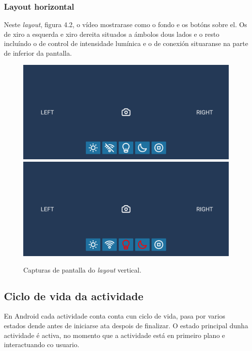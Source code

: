 \subsubsection{Layout horizontal}
Neste \emph{layout}, figura 4.2, o vídeo mostrarase como o fondo e os botóns sobre el. Os de xiro a esquerda e xiro dereita situados a ámbolos dous lados e o resto incluíndo o de control de intensidade lumínica e o de conexión situaranse na parte de inferior da pantalla.
\begin{figure}[tb]
  \centering
  \includegraphics[scale=.1]{imaxes/layout-horizontal1.png}
  \includegraphics[scale=.1]{imaxes/layout-horizontal2.png}
  \caption{Capturas de pantalla do \emph{layout} vertical.}
  \label{f:layout vertical}
\end{figure}
\subsection{Ciclo de vida da actividade}
En Android cada actividade conta conta cun ciclo de vida, pasa por varios estados dende antes de iniciarse ata despois de finalizar. O estado principal dunha actividade é activa, no momento que a actividade está en primeiro plano e interactuando co usuario.

